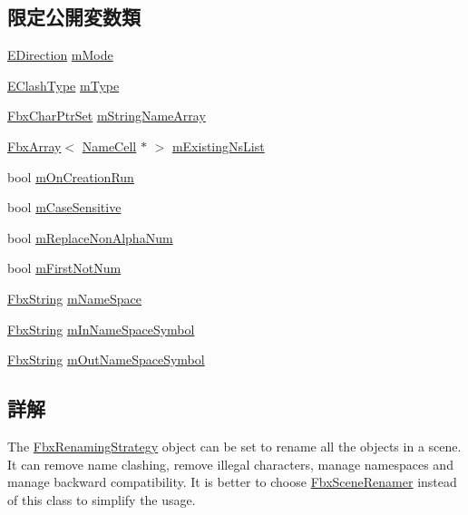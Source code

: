 \subsection*{限定公開変数類}
\begin{DoxyCompactItemize}
\item 
\hyperlink{class_fbx_renaming_strategy_a68099d97d087f66edd2ea873e0dbf423}{E\+Direction} \hyperlink{class_fbx_renaming_strategy_a45b2d8a796225657612cd579f675eb63}{m\+Mode}
\item 
\hyperlink{class_fbx_renaming_strategy_aacebe214cec13a6cdbbc9e40d16c57dd}{E\+Clash\+Type} \hyperlink{class_fbx_renaming_strategy_a9871e311bddf13b0263f71e646f5b06d}{m\+Type}
\item 
\hyperlink{class_fbx_char_ptr_set}{Fbx\+Char\+Ptr\+Set} \hyperlink{class_fbx_renaming_strategy_aca7cf36d91294a0fe5bce55803c89e7e}{m\+String\+Name\+Array}
\item 
\hyperlink{class_fbx_array}{Fbx\+Array}$<$ \hyperlink{struct_fbx_renaming_strategy_1_1_name_cell}{Name\+Cell} $\ast$ $>$ \hyperlink{class_fbx_renaming_strategy_a72b25f3cb4d18be1e8d5301fb27dad8b}{m\+Existing\+Ns\+List}
\item 
bool \hyperlink{class_fbx_renaming_strategy_adbe7f778a4619a416759f12d67df0496}{m\+On\+Creation\+Run}
\item 
bool \hyperlink{class_fbx_renaming_strategy_a6bce5341bf85474e9c3f0a891c18fc80}{m\+Case\+Sensitive}
\item 
bool \hyperlink{class_fbx_renaming_strategy_a894be493925c3dd2f7a6254c48eecde2}{m\+Replace\+Non\+Alpha\+Num}
\item 
bool \hyperlink{class_fbx_renaming_strategy_a5622ec5d07c1aa0151adffd81d760202}{m\+First\+Not\+Num}
\item 
\hyperlink{class_fbx_string}{Fbx\+String} \hyperlink{class_fbx_renaming_strategy_ac534ee7f8b50845f0850c237284f7ce4}{m\+Name\+Space}
\item 
\hyperlink{class_fbx_string}{Fbx\+String} \hyperlink{class_fbx_renaming_strategy_af1289c1ae1c96e8ad1ecde36c4e64edd}{m\+In\+Name\+Space\+Symbol}
\item 
\hyperlink{class_fbx_string}{Fbx\+String} \hyperlink{class_fbx_renaming_strategy_afcfc44febde7ce6eef47b632a070b4bf}{m\+Out\+Name\+Space\+Symbol}
\end{DoxyCompactItemize}


\subsection{詳解}
The \hyperlink{class_fbx_renaming_strategy}{Fbx\+Renaming\+Strategy} object can be set to rename all the objects in a scene. It can remove name clashing, remove illegal characters, manage namespaces and manage backward compatibility. It is better to choose \hyperlink{class_fbx_scene_renamer}{Fbx\+Scene\+Renamer} instead of this class to simplify the usage.

